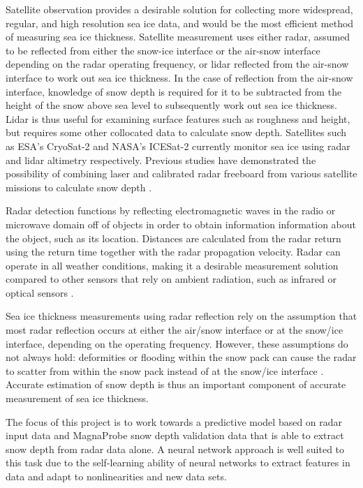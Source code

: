 \documentclass[11pt, a4paper]{article}
\begin{document}
Satellite observation provides a desirable solution for collecting more widespread, regular, and high resolution sea ice data,  and would be the most efficient method of measuring sea ice thickness.  Satellite measurement uses either radar, assumed to be reflected from either the snow-ice interface or the air-snow interface depending on the radar operating frequency,  or lidar reflected from the air-snow interface to work out sea ice thickness.  In the case of reflection from the air-snow interface,  knowledge of snow depth is required for it to be subtracted from the height of the snow above sea level to subsequently work out sea ice thickness.  Lidar is thus useful for examining surface features such as roughness and height, but requires some other collocated data to calculate snow depth.  Satellites such as ESA's CryoSat-2 and NASA's ICESat-2 currently monitor sea ice using radar and lidar altimetry respectively.  Previous studies have demonstrated the possibility of combining laser and calibrated radar freeboard from various satellite missions to calculate snow depth \cite{lawrence2018}.

Radar detection functions by reflecting electromagnetic waves in the radio or microwave domain off of objects in order to obtain information information about the object, such as its location.  Distances are calculated from the radar return using the return time together with the radar propagation velocity.  Radar can operate in all weather conditions, making it a desirable measurement solution compared to other sensors that rely on ambient radiation, such as infrared or optical sensors \cite{radar}.

Sea ice thickness measurements using radar reflection rely on the assumption that most radar reflection occurs at either the air/snow interface or at the snow/ice interface,  depending on the operating frequency. However,  these assumptions do not always hold: deformities or flooding within the snow pack can cause the radar to scatter from within the snow pack instead of at the snow/ice interface \cite{kubandpen}.  Accurate estimation of snow depth is thus an important component of accurate measurement of sea ice thickness. 

The focus of this project is to work towards a predictive model based on radar input data and MagnaProbe snow depth validation data that is able to extract snow depth from radar data alone.  A neural network approach is well suited to this task due to the self-learning ability of neural networks to extract features in data and adapt to nonlinearities and new data sets. 
\end{document}
